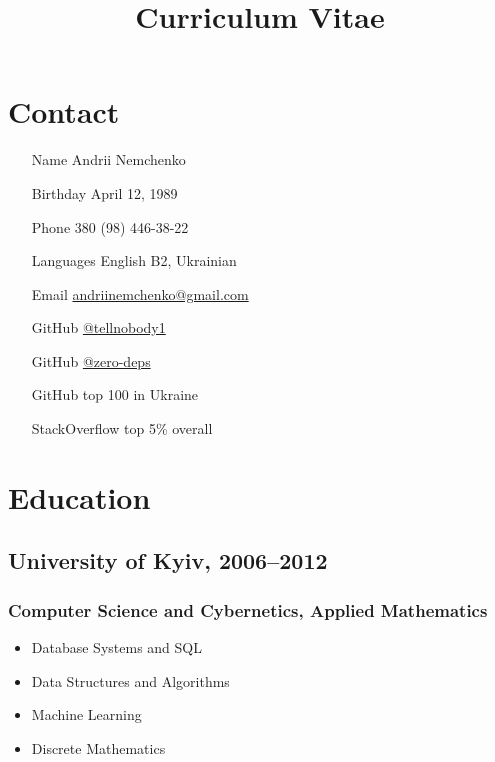 


\title{Curriculum Vitae}
\author{}
\date{}
\maketitle

\section*{Contact}
\begin{multicols}{2}
\begin{itemize}
  \item[Name] Andrii Nemchenko
  \item[Birthday] April 12, 1989
  \item[Phone] 380 (98) 446-38-22
  \item[Languages] English B2, Ukrainian
  \item[Email] \href{mailto:andriinemchenko@gmail.com}{andriinemchenko@gmail.com}
  \item[GitHub] \href{https://github.com/tellnobody1}{@tellnobody1}
  \item[GitHub] \href{https://github.com/zero-deps}{@zero-deps}
  \item[GitHub] top 100 in Ukraine
  \item[StackOverflow] top 5\% overall
\end{itemize}
\end{multicols}

\section*{Education}

\subsection*{University of Kyiv, 2006–2012}
\subsubsection*{Computer Science and Cybernetics, Applied Mathematics}
\begin{itemize}
  \item Database Systems and SQL
  \item Data Structures and Algorithms
  \item Machine Learning
  \item Discrete Mathematics
\end{itemize}

